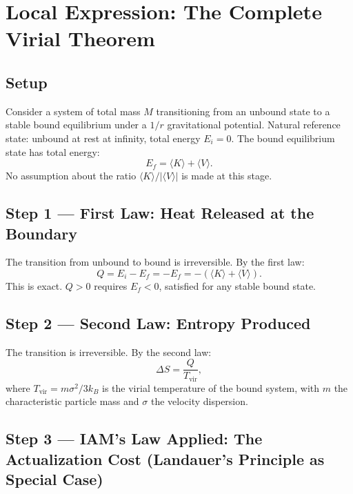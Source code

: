 \documentclass[12pt,a4paper]{article}
\begin{document}
\section{Local Expression: The Complete Virial Theorem}
\label{sec:local}

\subsection{Setup}

Consider a system of total mass $M$ transitioning from an unbound state
to a stable bound equilibrium under a $1/r$ gravitational potential.
Natural reference state: unbound at rest at infinity, total energy
$E_i = 0$. The bound equilibrium state has total energy:
\begin{equation}
E_f = \langle K \rangle + \langle V \rangle.
\label{eq:Ef}
\end{equation}
No assumption about the ratio $\langle K \rangle / |\langle V \rangle|$
is made at this stage.

\subsection{Step 1 --- First Law: Heat Released at the Boundary}

The transition from unbound to bound is irreversible. By the first law:
\begin{equation}
Q = E_i - E_f = -E_f = -(\langle K \rangle + \langle V \rangle).
\label{eq:Q_firstlaw}
\end{equation}
This is exact. $Q > 0$ requires $E_f < 0$, satisfied for any stable
bound state.

\subsection{Step 2 --- Second Law: Entropy Produced}

The transition is irreversible. By the second law:
\begin{equation}
\Delta S = \frac{Q}{T_\mathrm{vir}},
\label{eq:entropy_step2}
\end{equation}
where $T_\mathrm{vir} = m\sigma^2 / 3k_B$ is the virial temperature
of the bound system, with $m$ the characteristic particle mass and
$\sigma$ the velocity dispersion.

\subsection{Step 3 --- IAM's Law Applied: The Actualization Cost (Landauer's Principle as Special Case)}
\end{document}
